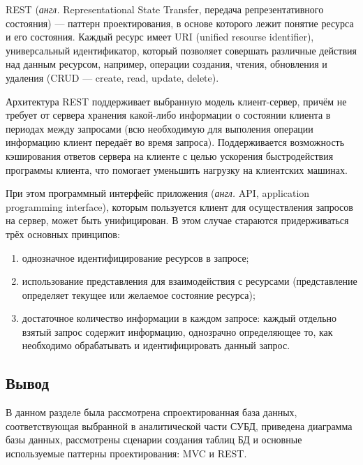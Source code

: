 REST (\textit{англ.} Representational State Transfer, передача репрезентативного состояния) --- паттерн проектирования, в основе которого лежит понятие ресурса и его состояния. 
Каждый ресурс имеет URI (unified resourse identifier), универсальный идентификатор, который позволяет совершать различные действия над данным ресурсом, например, операции создания, чтения, обновления и удаления (CRUD --- create, read, update, delete).

Архитектура REST поддерживает выбранную модель клиент-сервер, причём не требует от сервера хранения какой-либо информации о состоянии клиента в периодах между запросами (всю необходимую для выполения операции информацию клиент передаёт во время запроса).
Поддерживается возможность кэширования ответов сервера на клиенте с целью ускорения быстродействия программы клиента, что помогает уменьшить нагрузку на клиентских машинах.

При этом программный интерфейс приложения (\textit{англ.} API, application \linebreak programming interface), которым пользуется клиент для осуществления запросов на сервер, может быть унифицирован.
В этом случае стараются придерживаться трёх основных принципов:
\begin{enumerate}[label=\arabic*)]
	\item однозначное идентифицирование ресурсов в запросе;
	\item использование представления для взаимодействия с ресурсами (представление определяет текущее или желаемое состояние ресурса);
	\item достаточное количество информации в каждом запросе: каждый отдельно взятый запрос содержит информацию, однозрачно определяющее то, как необходимо обрабатывать и идентифицировать данный запрос.
\end{enumerate}

\subsection*{Вывод}

В данном разделе  была рассмотрена спроектированная база данных, соответствующая выбранной в  аналитической части СУБД, приведена диаграмма базы данных, рассмотрены сценарии создания таблиц БД и основные используемые паттерны проектирования: MVC и REST.

